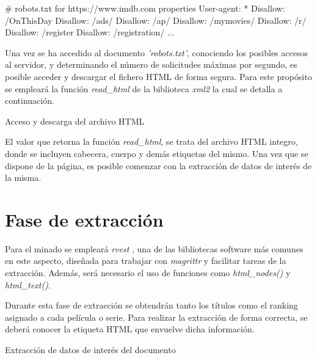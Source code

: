 \begin{Schunk}
    \begin{Soutput}
    # robots.txt for https://www.imdb.com properties
    User-agent: *
    Disallow: /OnThisDay
    Disallow: /ads/
    Disallow: /ap/
    Disallow: /mymovies/
    Disallow: /r/
    Disallow: /register
    Disallow: /registration/
    ...
    \end{Soutput}
\end{Schunk}
    

Una vez se ha accedido al documento \emph{'robots.txt'}, conociendo los posibles accesos al servidor, y
determinando el número de solicitudes máximas por segundo, es posible acceder y descargar el fichero
HTML de forma segura. Para este propósito se empleará la función \emph{read\_html} de la biblioteca
\emph{xml2} \cite{xml2-cran} la cual se detalla a continuación.

\begin{codefloat}

\caption{Acceso y descarga del archivo HTML}
\label{cod:acceso y descarga del archivo html}
\end{codefloat}

El valor que retorna la función \emph{read\_html}, se trata del archivo HTML integro, donde se incluyen
cabecera, cuerpo y demás etiquetas del mismo. Una vez que se dispone de la página, es posible comenzar
con la extracción de datos de interés de la misma.

\section{Fase de extracción}
\label{sec:fase de extraccion}

Para el minado se empleará \emph{rvest} \cite{rvest-cran}, una de las bibliotecas software más comunes en
este aspecto, diseñada para trabajar con \emph{magrittr} \cite{magrittr-cran} y facilitar tareas de la
extracción. Además, será necesario el uso de funciones como \emph{html\_nodes()} y \emph{html\_text()}.

Durante esta fase de extracción se obtendrán tanto los títulos como el ranking asignado a cada película o
serie. Para realizar la extracción de forma correcta, se deberá conocer la etiqueta HTML que envuelve dicha
información.

\begin{codefloat}

\caption{Extracción de datos de interés del documento}
\label{cod:extraccion de datos de interes del documento}
\end{codefloat}

